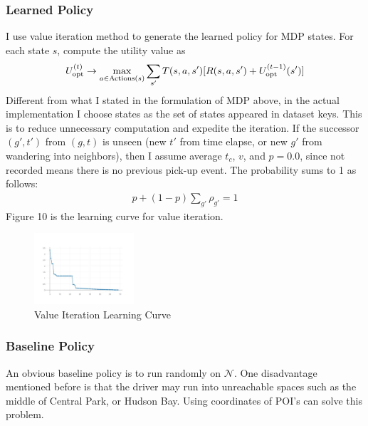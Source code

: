 \documentclass[letterpaper, 10 pt, conference]{ieeeconf}
\begin{document}
\subsubsection{Learned Policy}
I use value iteration method to generate the learned policy for MDP states. For each state $s$, compute the utility value as 
\begin{align}
U_{\text{opt}}^{(t)}\to \operatornamewithlimits{max}_{a\in \text{Actions}(s)}\sum_{s'}T(s,a,s')[R(s,a,s')+U_{\text{opt}}^{(t-1)}(s')]
\end{align}
Different from what I stated in the formulation of MDP above, in the actual implementation I choose states as the set of states appeared in dataset keys. This is to reduce unnecessary computation and expedite the iteration. If the successor $(g',t')$ from $(g,t)$ is unseen (new $t'$ from time elapse, or new $g'$ from wandering into neighbors), then I assume average $t_c$, $v$, and $p=0.0$, since not recorded means there is no previous pick-up event. The probability sums to 1 as follows:
\begin{align}
p + (1-p)\sum_{g'}\rho_{g'} =1
\end{align}
Figure 10 is the learning curve for value iteration.
\begin{figure}
\centering
\includegraphics[width=0.33\textwidth]{LearningCurve.jpeg}
\caption{Value Iteration Learning Curve}
\end{figure}
\subsubsection{Baseline Policy}
An obvious baseline policy is to run randomly on $\mathcal{N}$. One disadvantage mentioned before is that the driver may run into unreachable spaces such as the middle of Central Park, or Hudson Bay. Using coordinates of POI's can solve this problem.
\end{document}
